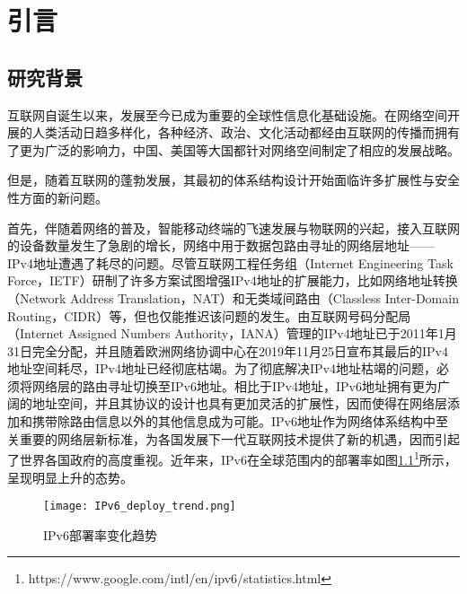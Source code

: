 
\chapter{引言}
\label{introduction}

  \section{研究背景}
  \label{introduction:background} 
  互联网自诞生以来，发展至今已成为重要的全球性信息化基础设施。在网络空间开展的人类活动日趋多样化，各种经济、政治、文化活动都经由互联网的传播而拥有了更为广泛的影响力，中国、美国等大国都针对网络空间制定了相应的发展战略\cite{china2016networkspace,USStrategyPlan}。

  但是，随着互联网的蓬勃发展，其最初的体系结构设计开始面临许多扩展性与安全性方面的新问题。

  首先，伴随着网络的普及，智能移动终端的飞速发展与物联网的兴起，接入互联网的设备数量发生了急剧的增长，网络中用于数据包路由寻址的网络层地址——IPv4地址\cite{RFC0791}遭遇了耗尽的问题。尽管互联网工程任务组（Internet Engineering Task Force，IETF）研制了许多方案试图增强IPv4地址的扩展能力，比如网络地址转换（Network Address Translation，NAT）\cite{RFC3022}和无类域间路由（Classless Inter-Domain Routing，CIDR）\cite{RFC1519}等，但也仅能推迟该问题的发生。由互联网号码分配局（Internet Assigned Numbers Authority，IANA）管理的IPv4地址已于2011年1月31日完全分配\cite{smith2011free}，并且随着欧洲网络协调中心在2019年11月25日宣布其最后的IPv4地址空间耗尽\cite{RIPENCC}，IPv4地址已经彻底枯竭。为了彻底解决IPv4地址枯竭的问题，必须将网络层的路由寻址切换至IPv6地址\cite{RFC2460}。相比于IPv4地址，IPv6地址拥有更为广阔的地址空间，并且其协议的设计也具有更加灵活的扩展性，因而使得在网络层添加和携带除路由信息以外的其他信息成为可能。IPv6地址作为网络体系结构中至关重要的网络层新标准，为各国发展下一代互联网技术提供了新的机遇，因而引起了世界各国政府的高度重视。近年来，IPv6在全球范围内的部署率如图\ref{fig:IPv6_deploy_trend}\footnote{https://www.google.com/intl/en/ipv6/statistics.html}所示，呈现明显上升的态势。

  \begin{figure}[ht]
    \centering
    \texttt{[image: IPv6\_deploy\_trend.png]}
    \caption{IPv6部署率变化趋势}
    \label{fig:IPv6_deploy_trend}
  \end{figure}

